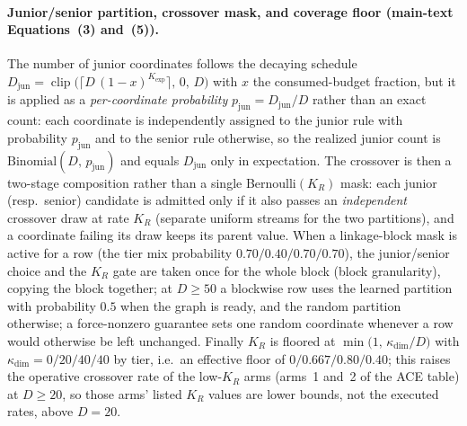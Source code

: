 \documentclass[10pt,a4paper]{article}
\begin{document}
\paragraph{Junior/senior partition, crossover mask, and coverage floor (main-text Equations~(3) and~(5)).}
The number of junior coordinates follows the decaying schedule
$D_{\mathrm{jun}} = \operatorname{clip}\!\bigl(\lceil D\,(1-x)^{K_{\exp}}\rceil,\,0,\,D\bigr)$
with $x$ the consumed-budget fraction, but it is applied as a \emph{per-coordinate
probability} $p_{\mathrm{jun}} = D_{\mathrm{jun}}/D$ rather than an exact count: each
coordinate is independently assigned to the junior rule with probability
$p_{\mathrm{jun}}$ and to the senior rule otherwise, so the realized junior count is
$\mathrm{Binomial}(D,\,p_{\mathrm{jun}})$ and equals $D_{\mathrm{jun}}$ only in
expectation.  The crossover is then a two-stage composition rather than a single
Bernoulli$(K_R)$ mask: each junior (resp.\ senior) candidate is admitted only if it
also passes an \emph{independent} crossover draw at rate $K_R$ (separate uniform
streams for the two partitions), and a coordinate failing its draw keeps its parent
value.  When a linkage-block mask is active for a row (the tier mix
probability $0.70/0.40/0.70/0.70$), the junior/senior choice and the $K_R$
gate are taken once for the whole block (block granularity), copying the block
together; at $D\ge50$ a blockwise row uses the learned partition with
probability $0.5$ when the graph is ready, and the random partition otherwise; a force-nonzero guarantee sets one random coordinate whenever a row would
otherwise be left unchanged.  Finally $K_R$ is floored at
$\min\!\bigl(1,\,\kappa_{\dim}/D\bigr)$ with $\kappa_{\dim}=0/20/40/40$ by tier, i.e.\
an effective floor of $0/0.667/0.80/0.40$; this raises the operative crossover rate of
the low-$K_R$ arms (arms~1 and~2 of the ACE table) at $D\ge 20$, so those arms' listed
$K_R$ values are lower bounds, not the executed rates, above $D=20$.
\end{document}
